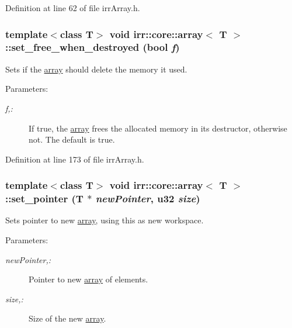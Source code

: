 Definition at line 62 of file irrArray.h.\hypertarget{classirr_1_1core_1_1array_0b66cac31609933337fb81bb4a518c8c}{
\subsubsection[{set\_\-free\_\-when\_\-destroyed}]{\setlength{\rightskip}{0pt plus 5cm}template$<$class T$>$ void {\bf irr::core::array}$<$ T $>$::set\_\-free\_\-when\_\-destroyed (bool {\em f})}}
\label{classirr_1_1core_1_1array_0b66cac31609933337fb81bb4a518c8c}


Sets if the \hyperlink{classirr_1_1core_1_1array}{array} should delete the memory it used. \begin{Desc}
\item[Parameters:]
\begin{description}
\item[{\em f,:}]If true, the \hyperlink{classirr_1_1core_1_1array}{array} frees the allocated memory in its destructor, otherwise not. The default is true. \end{description}
\end{Desc}


Definition at line 173 of file irrArray.h.\hypertarget{classirr_1_1core_1_1array_d0efa8d2ea5078580e5cea1848992a88}{
\subsubsection[{set\_\-pointer}]{\setlength{\rightskip}{0pt plus 5cm}template$<$class T$>$ void {\bf irr::core::array}$<$ T $>$::set\_\-pointer (T $\ast$ {\em newPointer}, \/  {\bf u32} {\em size})}}
\label{classirr_1_1core_1_1array_d0efa8d2ea5078580e5cea1848992a88}


Sets pointer to new \hyperlink{classirr_1_1core_1_1array}{array}, using this as new workspace. \begin{Desc}
\item[Parameters:]
\begin{description}
\item[{\em newPointer,:}]Pointer to new \hyperlink{classirr_1_1core_1_1array}{array} of elements. \item[{\em size,:}]Size of the new \hyperlink{classirr_1_1core_1_1array}{array}. \end{description}
\end{Desc}


